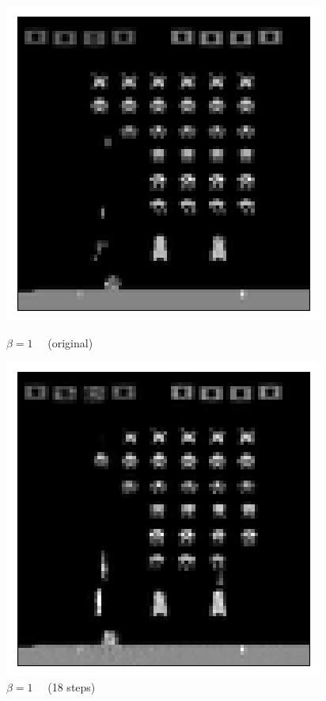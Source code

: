 \begin{figure}[h!]
\centering
\captionsetup{justification=centering}
\begin{multicols}{4}
    \includegraphics[scale=0.4]{figures/results/weighted_average/beta_1_posterior_sample_original.png}
    \caption{$\beta=1\quad$ (original)}
    \includegraphics[scale=0.4]{figures/results/weighted_average/beta_1_posterior_sample_18.png}
    \caption{$\beta=1\quad$ (18 steps)}

\end{multicols}
\end{figure}
